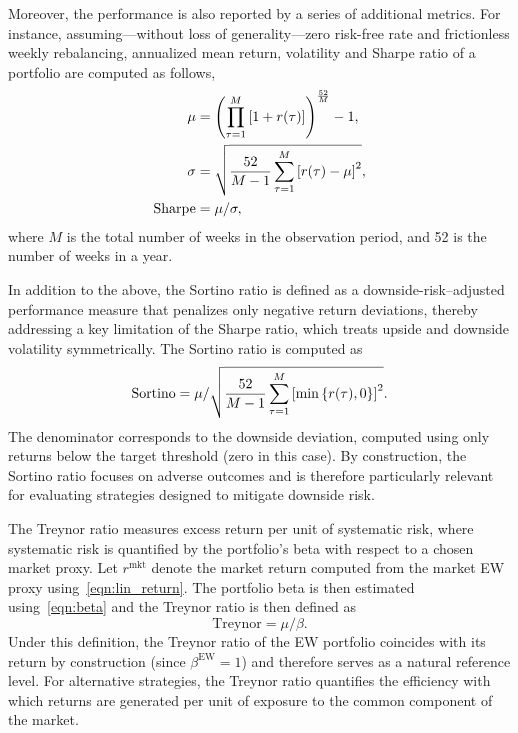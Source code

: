 \documentclass[pdflatex,sn-basic]{sn-jnl}%
\theoremstyle{thmstyleone}%
\theoremstyle{thmstyletwo}%
\theoremstyle{thmstylethree}%
\begin{document}
Moreover, the performance is also reported by a series of additional metrics. For instance, assuming---without loss of generality---zero risk-free rate and frictionless weekly rebalancing, annualized mean return, volatility and Sharpe ratio of a portfolio are computed as follows,
\begin{align}
    \mu &= \left(  \prod_{\tau=1}^{M} \left[ 1 + r(\tau) \right]  \right)^{\frac{52}{M}} - 1, \\
    \sigma &= \sqrt{\frac{52}{M-1} \sum_{\tau=1}^{M} \left[ r(\tau) - \mu \right]^2}, \\
    \textrm{Sharpe} &= \mu / \sigma,
\end{align}
where $M$ is the total number of weeks in the observation period, and 52 is the number of weeks in a year.

In addition to the above, the Sortino ratio is defined as a downside-risk–adjusted performance measure that penalizes only negative return deviations, thereby addressing a key limitation of the Sharpe ratio, which treats upside and downside volatility symmetrically. The Sortino ratio is computed as
\begin{equation}
\mathrm{Sortino}
=
\mu / \sqrt{\frac{52}{M-1} \sum_{\tau=1}^{M} \left[ \min\left\{ r(\tau), 0 \right\} \right]^2}.
\end{equation}
The denominator corresponds to the downside deviation, computed using only returns below the target threshold (zero in this case). By construction, the Sortino ratio focuses on adverse outcomes and is therefore particularly relevant for evaluating strategies designed to mitigate downside risk.

The Treynor ratio measures excess return per unit of systematic risk, where systematic risk is quantified by the portfolio's beta with respect to a chosen market proxy. Let $r^{\textrm{mkt}}$ denote the market return computed from the market EW proxy using~\eqref{eqn:lin_return}. The portfolio beta is then estimated using~\eqref{eqn:beta} and the Treynor ratio is then defined as
\begin{equation}
\mathrm{Treynor}
=
\mu / \beta.
\end{equation}
Under this definition, the Treynor ratio of the EW portfolio coincides with its return by construction (since $\beta^{\textrm{EW}}=1$) and therefore serves as a natural reference level. For alternative strategies, the Treynor ratio quantifies the efficiency with which returns are generated per unit of exposure to the common component of the market.
\end{document}
